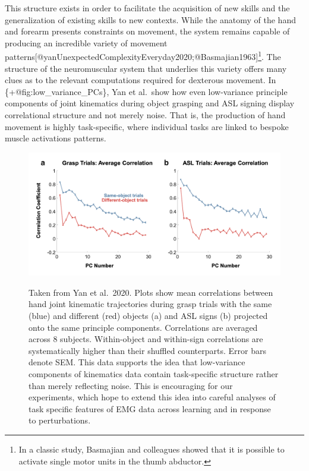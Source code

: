 This structure exists in order to facilitate the acquisition of new
skills and the generalization of existing skills to new contexts. While
the anatomy of the hand and forearm presents constraints on movement,
the system remains capable of producing an incredible variety of
movement
patterns{[}@yanUnexpectedComplexityEveryday2020;@Basmajian1963{]}\footnote{In
  a classic study, Basmajian and colleagues showed that it is possible
  to activate single motor units in the thumb abductor.}. The structure
of the neuromuscular system that underlies this variety offers many
clues as to the relevant computations required for dexterous movement.
In \{+@fig:low\_variance\_PCs\}, Yan et al.~show how even low-variance
principle components of joint kinematics during object grasping and ASL
signing display correlational structure and not merely noise. That is,
the production of hand movement is highly task-specific, where
individual tasks are linked to bespoke muscle activations patterns.

\begin{figure}
\label{fig:low_variance_PCs}
\centering
\includegraphics[width=1\textwidth,height=\textheight]{../images/physiology/background/low_variance_PCs.png}
\caption{Taken from Yan et al.~2020. Plots show mean correlations
between hand joint kinematic trajectories during grasp trials with the
same (blue) and different (red) objects (a) and ASL signs (b) projected
onto the same principle components. Correlations are averaged across 8
subjects. Within-object and within-sign correlations are systematically
higher than their shuffled counterparts. Error bars denote SEM. This
data supports the idea that low-variance components of kinematics data
contain task-specific structure rather than merely reflecting noise.
This is encouraging for our experiments, which hope to extend this idea
into careful analyses of task specific features of EMG data across
learning and in response to perturbations.}\label{fig:low_variance_PCs}
\end{figure}

